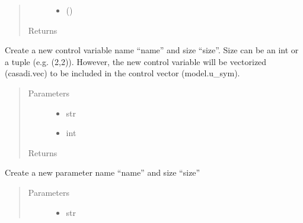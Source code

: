 \documentclass[letterpaper,10pt,english]{sphinxmanual}
\begin{document}
\begin{fulllineitems}
\begin{fulllineitems}
\begin{quote}
\begin{description}
\begin{itemize}
\item {} 
 () \textendash{} 

\end{itemize}

\item[{Returns}] \leavevmode


\end{description}\end{quote}

\end{fulllineitems}


\begin{fulllineitems}
\label{\detokenize{yaocptool.modelling:yaocptool.modelling.system_model.SystemModel.create_control}}
Create a new control variable name “name” and size “size”.
Size can be an int or a tuple (e.g. (2,2)). However, the new control variable will be vectorized (casadi.vec)
to be included in the control vector (model.u\_sym).
\begin{quote}\begin{description}
\item[{Parameters}] \leavevmode\begin{itemize}
\item {} 
 \textendash{} str

\item {} 
 \textendash{} int

\end{itemize}

\item[{Returns}] \leavevmode


\end{description}\end{quote}

\end{fulllineitems}


\begin{fulllineitems}
\label{\detokenize{yaocptool.modelling:yaocptool.modelling.system_model.SystemModel.create_parameter}}
Create a new parameter name “name” and size “size”
\begin{quote}\begin{description}
\item[{Parameters}] \leavevmode\begin{itemize}
\item {} 
 \textendash{} str


\end{itemize}
\end{description}
\end{quote}
\end{fulllineitems}
\end{fulllineitems}
\end{document}
